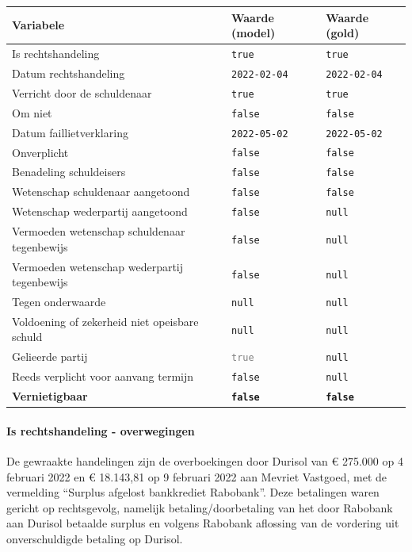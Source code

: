 \documentclass[
  dutch,
  a4paper,
]{article}
\begin{document}
\begin{center}
\small
\begin{tabular}{@{}p{7.4cm}p{2.6cm}p{2.6cm}@{}}
\toprule
Variabele & Waarde (model) & Waarde (gold) \\
\midrule
Is rechtshandeling & \texttt{true} & \texttt{true} \\
Datum rechtshandeling & \texttt{2022-02-04} & \texttt{2022-02-04} \\
Verricht door de schuldenaar & \texttt{true} & \texttt{true} \\
Om niet & \texttt{false} & \texttt{false} \\
Datum faillietverklaring & \texttt{2022-05-02} & \texttt{2022-05-02} \\
Onverplicht & \texttt{false} & \texttt{false} \\
Benadeling schuldeisers & \texttt{false} & \texttt{false} \\
Wetenschap schuldenaar aangetoond & \texttt{false} & \texttt{false} \\
Wetenschap wederpartij aangetoond & \texttt{false} & \texttt{null} \\
Vermoeden wetenschap schuldenaar tegenbewijs & \texttt{false} & \texttt{null} \\
Vermoeden wetenschap wederpartij tegenbewijs & \texttt{false} & \texttt{null} \\
Tegen onderwaarde & \texttt{null} & \texttt{null} \\
Voldoening of zekerheid niet opeisbare schuld & \texttt{null} & \texttt{null} \\
Gelieerde partij & \textcolor{gray}{\texttt{true}} & \texttt{null} \\
Reeds verplicht voor aanvang termijn & \texttt{false} & \texttt{null} \\
\textbf{Vernietigbaar} & \textbf{\texttt{false}} & \textbf{\texttt{false}} \\
\bottomrule
\end{tabular}
\end{center}

\paragraph{Is rechtshandeling - overwegingen}\label{is-rechtshandeling---overwegingen-13}

De gewraakte handelingen zijn de overboekingen door Durisol van € 275.000 op 4 februari 2022 en € 18.143,81 op 9 februari 2022 aan Mevriet Vastgoed, met de vermelding ``Surplus afgelost bankkrediet Rabobank''. Deze betalingen waren gericht op rechtsgevolg, namelijk betaling/doorbetaling van het door Rabobank aan Durisol betaalde surplus en volgens Rabobank aflossing van de vordering uit onverschuldigde betaling op Durisol.
\end{document}
